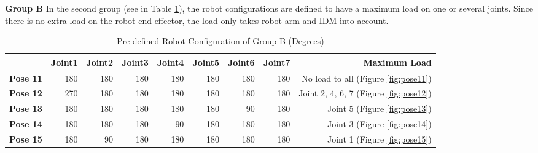 \textbf{Group B}
In the second group (see in Table \ref{table-groupB}), the robot configurations are defined to have a maximum load on one or several joints. Since there is no extra load on the robot end-effector, the load only takes robot arm and IDM into account. 


\begin{table}[]
	\centering
	\caption{Pre-defined Robot Configuration of Group B (Degrees)}
	\label{table-groupB}
	\begin{tabular}{|l|r|r|r|r|r|r|r|r|}
		\hline
		\textbf{}  & \textbf{Joint1} & \textbf{Joint2} & \textbf{Joint3} & \textbf{Joint4} & \textbf{Joint5} & \textbf{Joint6} & \textbf{Joint7} & \textbf{Maximum Load} \\ \hline
		\textbf{Pose 11} & 180   & 180   & 180    & 180   & 180   & 180   & 180   & No load to all (Figure \ref{fig:pose11})   \\ \hline
		\textbf{Pose 12} & 270   & 180   & 180    & 180   & 180   & 180   & 180   & Joint 2, 4, 6, 7 (Figure \ref{fig:pose12}) \\ \hline
		\textbf{Pose 13} & 180   & 180   & 180    & 180   & 180   & 90   & 180   & Joint 5 (Figure \ref{fig:pose13})      \\ \hline
		\textbf{Pose 14} & 180   & 180   & 180    & 90   & 180   & 180   & 180   & Joint 3 (Figure \ref{fig:pose14})      \\ \hline
		\textbf{Pose 15} & 180   & 90   & 180    & 180   & 180   & 180   & 180   & Joint 1 (Figure \ref{fig:pose15})      \\ \hline
	\end{tabular}
\end{table}


